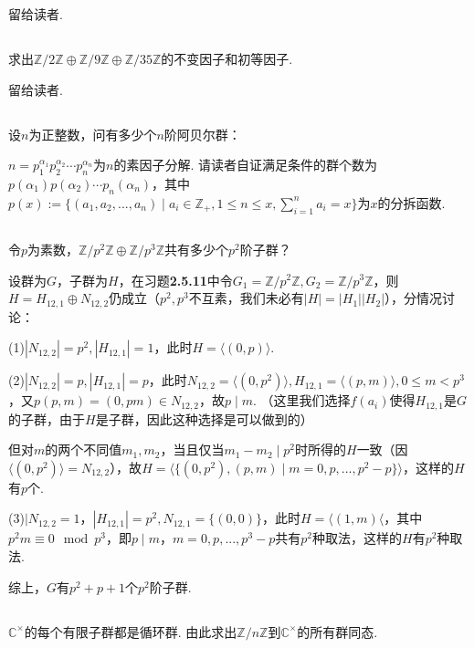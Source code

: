 \jie 留给读者.

\subsection{}
求出$\mathbb{Z}/2\mathbb{Z}\oplus \mathbb{Z}/9\mathbb{Z}\oplus \mathbb{Z}/35\mathbb{Z}$的不变因子和初等因子.

\jie 留给读者.

\subsection{}
设$n$为正整数，问有多少个$n$阶阿贝尔群：

\jie $n=p_1^{\alpha_1}p_2^{\alpha_2}\cdots p_n^{\alpha_n}$为$n$的素因子分解.
请读者自证满足条件的群个数为$p(\alpha_1)p(\alpha_2)\cdots p_n(\alpha_n)$，其中
$p(x):=\{(a_1,a_2,...,a_n)\mid a_i\in\mathbb{Z}_+, 1\leq n\leq x, \sum_{i=1}^na_i=x\}$为$x$的分拆函数.

\subsection{}
令$p$为素数，$\mathbb{Z}/p^2\mathbb{Z}\oplus \mathbb{Z}/p^3\mathbb{Z}$共有多少个$p^2$阶子群？

\jie 设群为$G$，子群为$H$，在{\heiti 习题}\textbf{2.5.11}中令$G_1=\mathbb{Z}/p^2\mathbb{Z}, G_2=\mathbb{Z}/p^3\mathbb{Z}$，则$H=H_{12,1}\oplus N_{12,2}$仍成立（$p^2,p^3$不互素，我们未必有$|H|=|H_1||H_2|$），分情况讨论：

(1)$|N_{12,2}|=p^2, |H_{12,1}|=1$，此时$H=\langle (0,p) \rangle$.

(2)$|N_{12,2}|=p, |H_{12,1}|=p$，此时$N_{12,2}=\langle (0,p^2) \rangle,
H_{12,1}=\langle (p,m)\rangle, 0\leq m<p^3$，又$p(p,m)=(0,pm)\in N_{12,2}$，故$p\mid m$. 
（这里我们选择$f(a_i)$使得$H_{12,1}$是$G$的子群，由于$H$是子群，因此这种选择是可以做到的）

但对$m$的两个不同值$m_1,m_2$，当且仅当$m_1-m_2\mid p^2$时所得的$H$一致（因$\langle (0,p^2) \rangle=N_{12,2}$），故$H=\langle \{(0,p^2),(p,m)\mid m=0,p,...,p^2-p\}\rangle$，这样的$H$有$p$个.

(3)$|N_{12,2}=1$，$|H_{12,1}|=p^2, N_{12,1}=\{(0,0)\}$，此时$H=\langle (1,m)\langle$，其中$p^2m\equiv 0\mod p^3$，即$p\mid m$，$m=0,p,...,p^3-p$共有$p^2$种取法，这样的$H$有$p^2$种取法.

综上，$G$有$p^2+p+1$个$p^2$阶子群.

\subsection{}
$\mathbb{C}^{\times}$的每个有限子群都是循环群. 由此求出$\mathbb{Z}/n\mathbb{Z}$到$\mathbb{C}^{\times}$的所有群同态.

